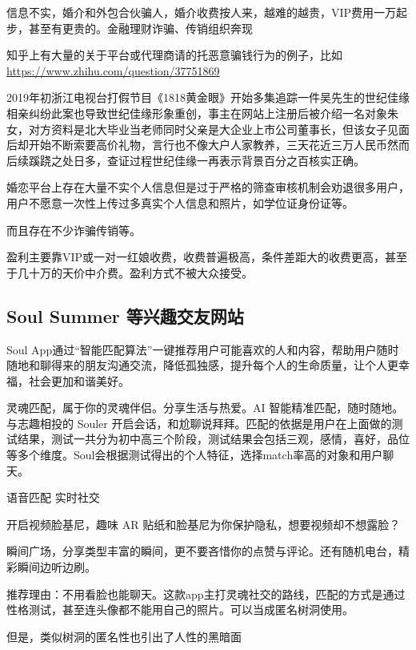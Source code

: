 \documentclass[UTF8]{ctexart}
\begin{document}
信息不实，婚介和外包合伙骗人，婚介收费按人来，越难的越贵，VIP费用一万起步，甚至有更贵的。金融理财诈骗、传销组织奔现

知乎上有大量的关于平台或代理商请的托恶意骗钱行为的例子，比如\url{https://www.zhihu.com/question/37751869}


\begin{tcolorbox}
    2019年初浙江电视台打假节目《1818黄金眼》开始多集追踪一件吴先生的世纪佳缘相亲纠纷此案也导致世纪佳缘形象重创，事主在网站上注册后被介绍一名对象朱女，对方资料是北大毕业当老师同时父亲是大企业上市公司董事长，但该女子见面后却开始不断索要高价礼物，言行也不像大户人家教养，三天花近三万人民币然而后续蹊跷之处日多，查证过程世纪佳缘一再表示背景百分之百核实正确。\cite{WikiJiayuan}
\end{tcolorbox}

婚恋平台上存在大量不实个人信息但是过于严格的筛查审核机制会劝退很多用户，用户不愿意一次性上传过多真实个人信息和照片，如学位证身份证等。

而且存在不少诈骗传销等。

盈利主要靠VIP或一对一红娘收费，收费普遍极高，条件差距大的收费更高，甚至于几十万的天价中介费。盈利方式不被大众接受。

\subsection{Soul Summer 等兴趣交友网站}

Soul App通过“智能匹配算法”一键推荐用户可能喜欢的人和内容，帮助用户随时随地和聊得来的朋友沟通交流，降低孤独感，提升每个人的生命质量，让个人更幸福，社会更加和谐美好。

灵魂匹配，属于你的灵魂伴侣。分享生活与热爱。AI 智能精准匹配，随时随地。与志趣相投的 Souler 开启会话，和尬聊说拜拜。匹配的依据是用户在上面做的测试结果，测试一共分为初中高三个阶段，测试结果会包括三观，感情，喜好，品位等多个维度。Soul会根据测试得出的个人特征，选择match率高的对象和用户聊天。

语音匹配 实时社交

开启视频脸基尼，趣味 AR 贴纸和脸基尼为你保护隐私，想要视频却不想露脸？

瞬间广场，分享类型丰富的瞬间，更不要吝惜你的点赞与评论。还有随机电台，精彩瞬间边听边刷。

推荐理由：不用看脸也能聊天。这款app主打灵魂社交的路线，匹配的方式是通过性格测试，甚至连头像都不能用自己的照片。可以当成匿名树洞使用。

但是，类似树洞的匿名性也引出了人性的黑暗面
\end{document}
